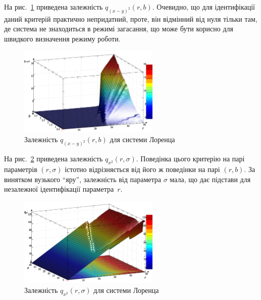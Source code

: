 На рис.~\ref{atu:f:lor_qxmy2_r_b} приведена залежність
$q_{(x-y)^2}(r,b)$.
Очевидно, що для ідентифікації даний критерій практично
непридатний, проте, він відмінний від нуля тільки там, де система
не знаходиться в режимі загасання, що може бути корисно для
швидкого визначення режиму роботи.

\begin{figure}[htb!]
  \begin{center}
    \includegraphics[width=0.60\textwidth]{p/cha/lor/q2d/lor_qxmy2_r_b.png}
  \end{center}
  \caption{Залежність $q_{(x-y)^2}(r,b) $ для системи Лоренца}
  \label{atu:f:lor_qxmy2_r_b}
\end{figure}


На рис.~\ref{atu:f:lor_qx2_r_sigma} приведена залежність
$q_{x^2}(r,\sigma)$.
Поведінка цього критерію на парі параметрів
$(r, \sigma) $ істотно відрізняється від його ж поведінки на парі
$(r, b) $. За винятком вузького ``яру'', залежність від параметра
$\sigma $ мала, що дає підстави для незалежної ідентифікації
параметра~$r$.

\begin{figure}[htb!]
  \begin{center}
    \includegraphics[width=0.60\textwidth]{p/cha/lor/q2d/lor_qx2_r_sigma.png}
  \end{center}
  \caption{Залежність $q_{x^2}(r,\sigma)$ для системи Лоренца}
  \label{atu:f:lor_qx2_r_sigma}
\end{figure}


